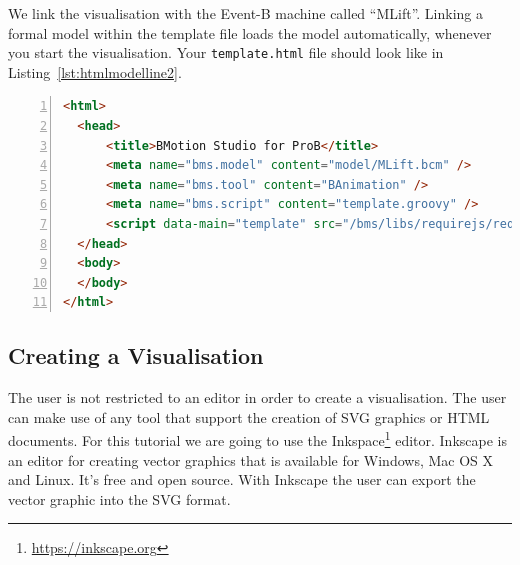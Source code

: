 We link the visualisation with the Event-B machine called ``MLift''.
Linking a formal model within the template file loads the model automatically, whenever you start the visualisation.
Your \texttt{template.html} file should look like in Listing~\ref{lst:htmlmodelline2}.

\begin{lstlisting}[float=ht,language=html, numbers=left,                   numbersep=5pt,            
  numberstyle=\tiny,caption={Template HTML file after linking the Event-B model with the visualisation},label=lst:htmlmodelline2]
<html>
  <head>
      <title>BMotion Studio for ProB</title>
      <meta name="bms.model" content="model/MLift.bcm" />
      <meta name="bms.tool" content="BAnimation" />
      <meta name="bms.script" content="template.groovy" />
      <script data-main="template" src="/bms/libs/requirejs/require.js"></script>
  </head>
  <body>
  </body>
</html>
\end{lstlisting}


\subsection{Creating a Visualisation}

The user is not restricted to an editor in order to create a visualisation.
The user can make use of any tool that support the creation of SVG graphics or HTML documents.
For this tutorial we are going to use the Inkspace\footnote{\url{https://inkscape.org}} editor. Inkscape is an editor for creating vector graphics that is available for Windows, Mac OS X and Linux.
It's free and open source.
With Inkscape the user can export the vector graphic into the SVG format.


